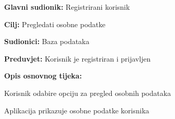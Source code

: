 					\noindent {}
					\begin{packed_item}
						
						\item \textbf{Glavni sudionik: } Registrirani korisnik
						\item  \textbf{Cilj:} Pregledati osobne podatke
						\item  \textbf{Sudionici:} Baza podataka
						\item  \textbf{Preduvjet:} Korisnik je registriran i prijavljen
						\item  \textbf{Opis osnovnog tijeka:}
						
						\item[] \begin{packed_enum}
							
							\item Korisnik odabire opciju za pregled osobnih podataka
							\item Aplikacija prikazuje osobne podatke korisnika
						\end{packed_enum}
					
					\end{packed_item}
					
